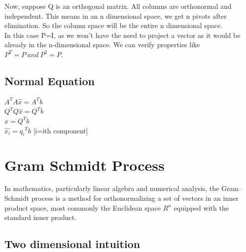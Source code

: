 \documentclass[]{article}
\begin{document}
\noindent
Now, suppose Q is an orthogonal matrix. All columns are orthonormal and independent. This means in an n dimensional space, we get n pivots after elimination. So the column space will be the entire n dimensional space.\\

\noindent
In this case P=I, as we won't have the need to project a vector as it would be already in the n-dimensional space. We can verify properties like $P^T=P \ and \ P^2=P$.\\

\vspace{10pt}

\subsection{Normal Equation}

\vspace{10pt}

$A^TA\hat{x}=A^Tb$\\
$Q^TQ\hat{x}=Q^Tb$\\

\noindent
$\hat{x}=Q^Tb$\\

\noindent
$\hat{x_i}={q_i}^Tb$ [i=ith component]\\

\vspace{10pt}
\section{Gram Schmidt Process}
In mathematics, particularly linear algebra and numerical analysis, the Gram–Schmidt process is a method for orthonormalizing a set of vectors in an inner product space, most commonly the Euclidean space $R^n$ equipped with the standard inner product.

\vspace{10pt}

\subsection{Two dimensional intuition}
\vspace{10pt}
\end{document}
